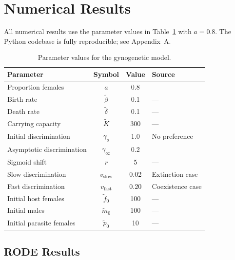 \documentclass[12pt]{article}
\begin{document}
\section{Numerical Results}
All numerical results use the parameter values in Table~\ref{tab:parameters} with $a = 0.8$.  The Python codebase is fully reproducible; see Appendix~A.

\begin{table}[htbp]
  \centering
  \caption{Parameter values for the gynogenetic model.}
  \label{tab:parameters}
  \begin{tabular}{lccl}
    \toprule
    Parameter & Symbol & Value & Source \\
    \midrule
    Proportion females & $a$ & 0.8 & \citet{Balsano1989} \\
    Birth rate & $\tilde{\beta}$ & 0.1 & --- \\
    Death rate & $\tilde{\delta}$ & 0.1 & --- \\
    Carrying capacity & $\tilde{K}$ & 300 & --- \\
    Initial discrimination & $\gamma_o$ & 1.0 & No preference \\
    Asymptotic discrimination & $\gamma_\infty$ & 0.2 & \citet{Riesch2008} \\
    Sigmoid shift & $r$ & 5 & --- \\
    Slow discrimination & $v_{\text{slow}}$ & 0.02 & Extinction case \\
    Fast discrimination & $v_{\text{fast}}$ & 0.20 & Coexistence case \\
    Initial host females & $\tilde{f}_0$ & 100 & --- \\
    Initial males & $\tilde{m}_0$ & 100 & --- \\
    Initial parasite females & $\tilde{p}_0$ & 10 & --- \\
    \bottomrule
  \end{tabular}
\end{table}


\subsection{RODE Results}
\end{document}
